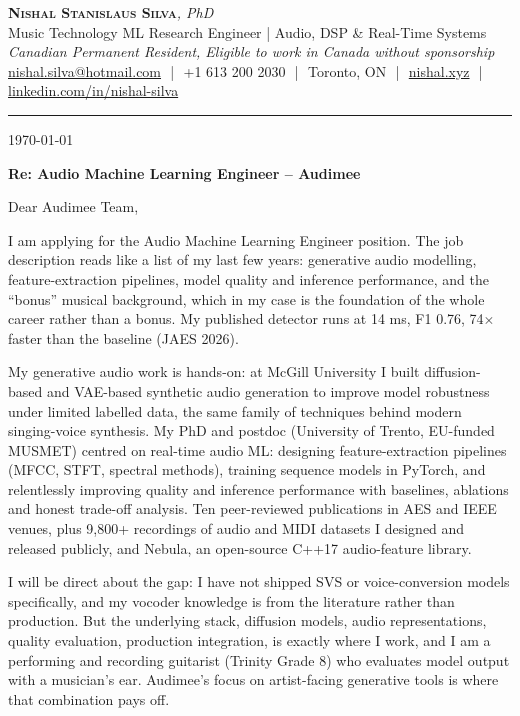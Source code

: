 \documentclass[11pt]{article}
\newcommand{\clName}{Nishal Stanislaus Silva}
\newcommand{\clStatus}{Canadian Permanent Resident, Eligible to work in Canada without sponsorship}
\newcommand{\clTagline}{Music Technology ML Research Engineer | Audio, DSP \& Real-Time Systems}
\newcommand{\clRole}{Audio Machine Learning Engineer}
\newcommand{\clCompany}{Audimee}
\begin{document}
\pagestyle{empty}
\begin{center}
    {\LARGE \scshape \textbf{\clName}}{\large \textit{, PhD}}
    \\[1pt]
    {\small \clTagline}
    \\[1pt]
    {\footnotesize\textit{\clStatus}}
    \\[1pt]
    {\small
    \href{mailto:nishal.silva@hotmail.com}{nishal.silva@hotmail.com}
    \,\,|\,\, +1 613 200 2030
    \,\,|\,\, Toronto, ON
    \,\,|\,\, \href{https://nishal.xyz}{nishal.xyz}
    \,\,|\,\, \href{https://www.linkedin.com/in/nishal-silva}{linkedin.com/in/nishal-silva}}
\end{center}

\rule{\linewidth}{0.4pt}\vspace{0.6em}

\today

\textbf{Re: \clRole{} -- \clCompany{}}

Dear Audimee Team,

I am applying for the \clRole{} position. The job description reads like a list of my last few years: generative audio modelling, feature-extraction pipelines, model quality and inference performance, and the ``bonus'' musical background, which in my case is the foundation of the whole career rather than a bonus. My published detector runs at 14 ms, F1 0.76, 74$\times$ faster than the baseline (JAES 2026).

My generative audio work is hands-on: at McGill University I built diffusion-based and VAE-based synthetic audio generation to improve model robustness under limited labelled data, the same family of techniques behind modern singing-voice synthesis. My PhD and postdoc (University of Trento, EU-funded MUSMET) centred on real-time audio ML: designing feature-extraction pipelines (MFCC, STFT, spectral methods), training sequence models in PyTorch, and relentlessly improving quality and inference performance with baselines, ablations and honest trade-off analysis. Ten peer-reviewed publications in AES and IEEE venues, plus 9,800+ recordings of audio and MIDI datasets I designed and released publicly, and Nebula, an open-source C++17 audio-feature library.

I will be direct about the gap: I have not shipped SVS or voice-conversion models specifically, and my vocoder knowledge is from the literature rather than production. But the underlying stack, diffusion models, audio representations, quality evaluation, production integration, is exactly where I work, and I am a performing and recording guitarist (Trinity Grade 8) who evaluates model output with a musician's ear. Audimee's focus on artist-facing generative tools is where that combination pays off.
\end{document}

